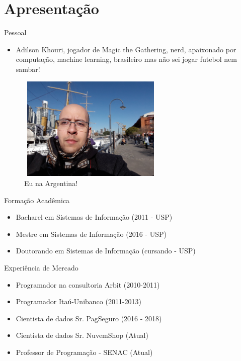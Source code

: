 \section{Apresentação}

\begin{frame}	
	\begin{block}{Pessoal}	
		\begin{itemize}
			\item Adilson Khouri,  jogador de Magic the Gathering, nerd, apaixonado por computação, machine learning, brasileiro mas não sei jogar futebol nem sambar!
		\end{itemize}
		\begin{figure}[!htb]
			\centering	  				
			\includegraphics[height=5cm, width = 7cm]{./pic/AdilsonArgentina.jpg}
			\caption{Eu na Argentina!}
			\label{fig_adilson_argentina}
		\end{figure}
		
	\end{block}
\end{frame}
			
\begin{frame}	
	\begin{block}{Formação Acadêmica}
		 \begin{itemize}
			  \item Bacharel em Sistemas de Informação (2011 - USP)
			  \item Mestre em Sistemas de Informação (2016 - USP)
			  \item Doutorando em Sistemas de Informação (cursando - USP)
		  \end{itemize}
	\end{block}
\end{frame}

\begin{frame}	
	\begin{block}{Experiência de Mercado}
		\begin{itemize}
			\item Programador na consultoria Arbit (2010-2011)
			\item Programador Itaú-Unibanco (2011-2013)
			\item Cientista de dados Sr. PagSeguro (2016 - 2018)
			\item Cientista de dados Sr. NuvemShop (Atual)
			\item Professor de Programação - SENAC (Atual)
		\end{itemize}
	\end{block}
\end{frame}
